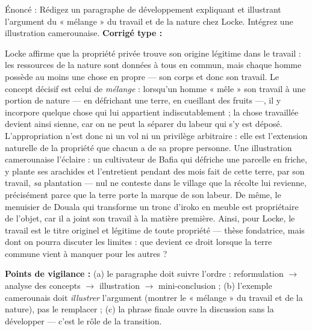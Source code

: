 \documentclass[11pt]{article}
\newcommand{\cle}[1]{{\popxbold\color{popdark}#1}}
\newcounter{popsec}
\newcounter{popsub}
\newcommand{\courssub}[1]{%
  \stepcounter{popsub}%
  \par\vspace{9pt}\noindent{\popxbold\fontsize{11.5}{13}\selectfont\color{popink}{\color{poporange}\thepopsec.\thepopsub}\hspace{6pt}#1}\par\nopagebreak\vspace{4pt}
}
\begin{document}
\begin{exoresolu}
Énoncé : Rédigez un paragraphe de développement expliquant et illustrant l'argument du « mélange » du travail et de la nature chez Locke. Intégrez une illustration camerounaise.
\tcblower
\textbf{Corrigé type :}

Locke affirme que la propriété privée trouve son origine légitime dans le travail : les ressources de la nature sont données à tous en commun, mais chaque homme possède au moins une chose en propre — son corps et donc son travail. Le concept décisif est celui de \emph{mélange} : lorsqu'un homme « mêle » son travail à une portion de nature — en défrichant une terre, en cueillant des fruits —, il y incorpore quelque chose qui lui appartient indiscutablement ; la chose travaillée devient ainsi sienne, car on ne peut la séparer du labeur qui s'y est déposé. L'\cle{appropriation} n'est donc ni un vol ni un privilège arbitraire : elle est l'extension naturelle de la propriété que chacun a de sa propre personne. Une illustration camerounaise l'éclaire : un cultivateur de Bafia qui défriche une parcelle en friche, y plante ses arachides et l'entretient pendant des mois fait de cette terre, par son travail, \emph{sa} plantation — nul ne conteste dans le village que la récolte lui revienne, précisément parce que la terre porte la marque de son labeur. De même, le menuisier de Douala qui transforme un tronc d'iroko en meuble est propriétaire de l'objet, car il a joint son travail à la matière première. Ainsi, pour Locke, le travail est le titre originel et légitime de toute propriété — thèse fondatrice, mais dont on pourra discuter les limites : que devient ce droit lorsque la terre commune vient à manquer pour les autres ?

\textbf{Points de vigilance :} (a) le paragraphe doit suivre l'ordre : reformulation $\rightarrow$ analyse des concepts $\rightarrow$ illustration $\rightarrow$ mini-conclusion ; (b) l'exemple camerounais doit \emph{illustrer} l'argument (montrer le « mélange » du travail et de la nature), pas le remplacer ; (c) la phrase finale ouvre la discussion sans la développer — c'est le rôle de la transition.
\end{exoresolu}

\courssub{La conclusion et la relecture}
\end{document}
